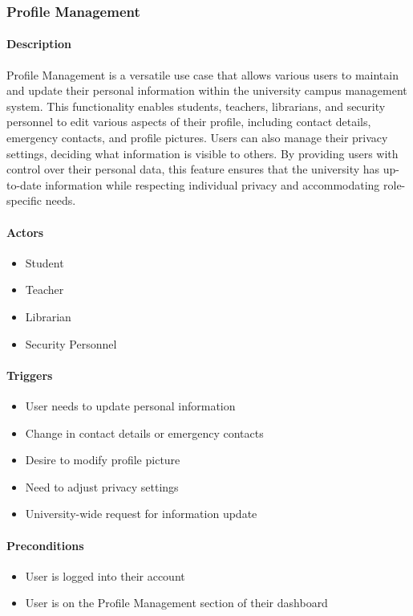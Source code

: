 \subsubsection{Profile Management}

\paragraph{Description}
Profile Management is a versatile use case that allows various users to maintain and update their personal information within the university campus management system. This functionality enables students, teachers, librarians, and security personnel to edit various aspects of their profile, including contact details, emergency contacts, and profile pictures. Users can also manage their privacy settings, deciding what information is visible to others. By providing users with control over their personal data, this feature ensures that the university has up-to-date information while respecting individual privacy and accommodating role-specific needs.

\paragraph{Actors}
\begin{itemize}
    \item Student
    \item Teacher
    \item Librarian
    \item Security Personnel
\end{itemize}

\paragraph{Triggers}
\begin{itemize}
    \item User needs to update personal information
    \item Change in contact details or emergency contacts
    \item Desire to modify profile picture
    \item Need to adjust privacy settings
    \item University-wide request for information update
\end{itemize}

\paragraph{Preconditions}
\begin{itemize}
    \item User is logged into their account
    \item User is on the Profile Management section of their dashboard
\end{itemize}

